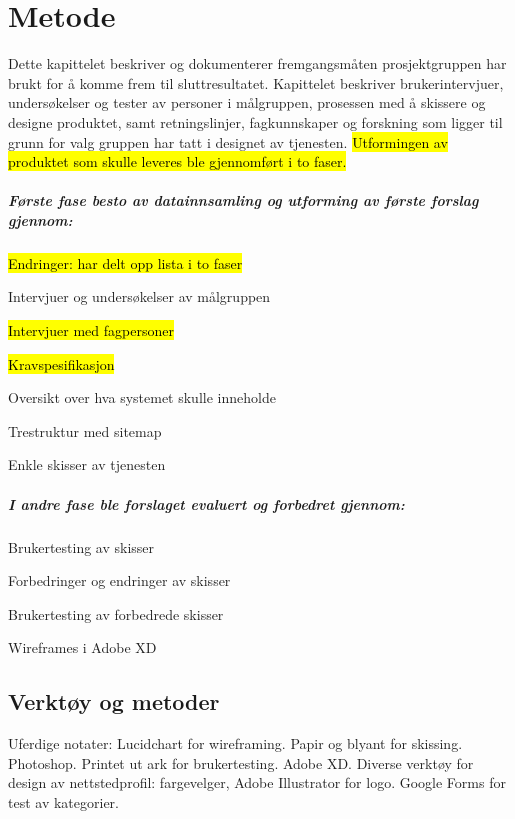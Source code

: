 \cleardoublepage
\chapter{Metode}
\label{chap:method}

Dette kapittelet beskriver og dokumenterer fremgangsmåten prosjektgruppen har brukt for å komme frem til sluttresultatet. Kapittelet beskriver brukerintervjuer, undersøkelser og tester av personer i målgruppen, prosessen med å skissere og designe produktet, samt retningslinjer, fagkunnskaper og forskning som ligger til grunn for valg gruppen har tatt i designet av tjenesten. \hl{Utformingen av produktet som skulle leveres ble gjennomført i to faser.}

\paragraph{Første fase besto av datainnsamling og utforming av første forslag gjennom:}
\hl{Endringer: har delt opp lista i to faser}
\begin{compactitem}
\item Intervjuer og undersøkelser av målgruppen
\item \hl{Intervjuer med fagpersoner}
\item \hl{Kravspesifikasjon}
\item Oversikt over hva systemet skulle inneholde
\item Trestruktur med sitemap
\item Enkle skisser av tjenesten
\end{compactitem}

\paragraph{I andre fase ble forslaget evaluert og forbedret gjennom:}
\begin{compactitem}
\item Brukertesting av skisser
\item Forbedringer og endringer av skisser
\item Brukertesting av forbedrede skisser
\item Wireframes i Adobe XD
\end{compactitem}
\section{Verktøy og metoder}
Uferdige notater:
Lucidchart for wireframing.
Papir og blyant for skissing.
Photoshop.
Printet ut ark for brukertesting.
Adobe XD.
Diverse verktøy for design av nettstedprofil: fargevelger, Adobe Illustrator for logo.
Google Forms for test av kategorier.


